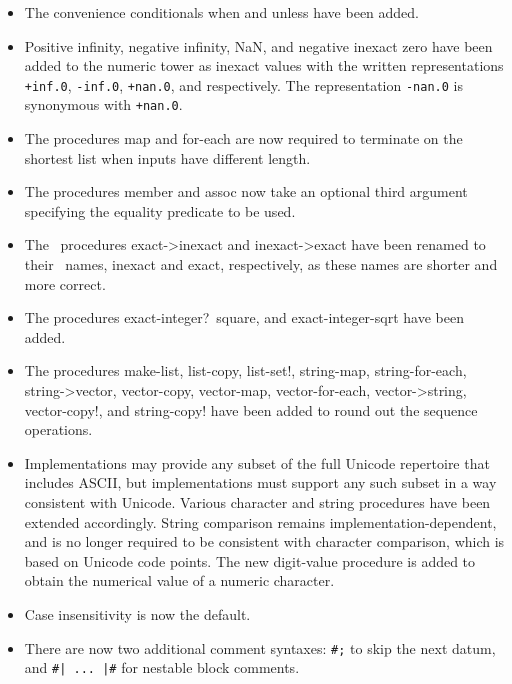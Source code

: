 \begin{itemize}
\item The convenience conditionals {\cf when} and {\cf unless} have been added.

\item Positive infinity, negative infinity, NaN, and negative inexact zero have been added
to the numeric tower as inexact values with the written
representations {\tt +inf.0}, {\tt -inf.0}, {\tt +nan.0}, and {}
respectively.
The representation {\tt -nan.0} is synonymous with {\tt +nan.0}.

\item The procedures {\cf map} and {\cf for-each} are now required to terminate on
the shortest list when inputs have different length.

\item The procedures {\cf member} and {\cf assoc} now take an optional third argument
specifying the equality predicate to be used.

\item The \rfivers\ procedures {\cf exact->inexact} and {\cf inexact->exact}
have been renamed to their \rsixrs\ names, {\cf inexact} and {\cf exact},
respectively, as these names are shorter and more correct.

\item The procedures {\cf exact-integer?}\, {\cf square},
and {\cf exact-integer-sqrt} have been added.

\item The procedures {\cf make-list}, {\cf list-copy}, {\cf list-set!},
{\cf string-map}, {\cf string-for-each}, {\cf string->vector}, 
{\cf vector-copy}, {\cf vector-map}, {\cf vector-for-each}, 
{\cf vector->string}, {\cf vector-copy!}, and {\cf string-copy!}
have been added to round out the sequence operations.

\item Implementations may provide any subset of the full Unicode
repertoire that includes ASCII, but implementations must support any
such subset in a way consistent with Unicode.
Various character and string procedures have been extended accordingly.
String comparison remains implementation-dependent, and is no longer
required to be consistent with character comparison, which is based
on Unicode code points.
The new {\cf digit-value} procedure is added to obtain the numerical
value of a numeric character.

\item Case insensitivity is now the default.

\item There are now two additional comment syntaxes: {\tt \#;} to
skip the next datum, and {\tt \#| ... |\#}
for nestable block comments.


\end{itemize}
